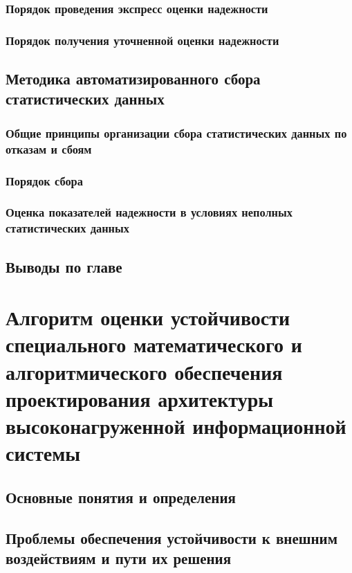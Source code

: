 \subsection{Порядок проведения экспресс оценки надежности}\label{sec:ch3/sect4/sub1}
\subsection{Порядок получения уточненной оценки надежности}\label{sec:ch3/sect4/sub2}
\section{Методика автоматизированного сбора статистических данных}\label{sec:ch3/sect5}
\subsection{Общие принципы организации сбора статистических данных по отказам и сбоям}\label{sec:ch3/sect5/sub1}
\subsection{Порядок сбора }\label{sec:ch3/sect5/sub2}
\subsection{Оценка показателей надежности в условиях неполных статистических данных}\label{sec:ch3/sect5/sub3}

\section{Выводы по главе}\label{sec:ch3/conc}

\clearpage

\chapter{Алгоритм оценки устойчивости специального математического и алгоритмического обеспечения проектирования архитектуры высоконагруженной информационной системы}\label{ch:ch6}

\section{Основные понятия и определения}\label{sec:ch6/sect1}
\section{Проблемы обеспечения устойчивости к внешним воздействиям и пути их решения}\label{sec:ch6/sect2}

